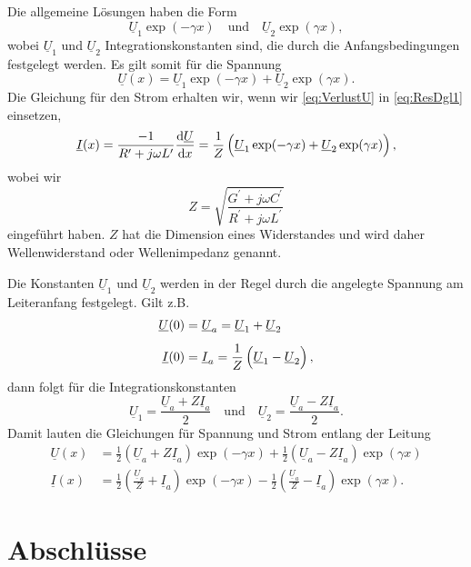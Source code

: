 \documentclass[paper=a4, parskip=half-, ngerman, fontsize=11pt]{scrreprt}
\begin{document}
Die allgemeine Lösungen haben die Form
\[ \underline{U}_{1} \exp(- \gamma x) \quad \text{und} \quad \underline{U}_{2} \exp(\gamma x), \] wobei
$\underline{U}_{1}$ und $\underline{U}_{2}$ Integrationskonstanten sind, die durch die Anfangsbedingungen festgelegt
werden.
Es gilt somit für die Spannung
\begin{equation}
    \underline{U}(x) = \underline{U}_{1} \exp(- \gamma x) + \underline{U}_{2} \exp(\gamma x) \label{eq:VerlustU}.
\end{equation}
Die Gleichung für den Strom erhalten wir, wenn wir \eqref{eq:VerlustU} in \eqref{eq:ResDgl1} einsetzen,
\begin{equation}
    \underline{I}(x) = \frac{-1}{R^{\prime} + j \omega L^{\prime}} \frac{\text{d} \underline{U}}{\text{d} x}
    = \frac{1}{Z}
    \left(
    \vphantom{\sqrt{1}{Z}}
    \underline{U}_{1} \exp(- \gamma x) + \underline{U}_{2} \exp(\gamma x) \right),
\end{equation}
wobei wir
\begin{equation}
    Z = \sqrt{\frac{G^{\prime} + j \omega C^{\prime}}{R^{\prime} + j \omega L^{\prime}}}
\end{equation}
eingeführt haben. $Z$ hat die Dimension eines Widerstandes und wird daher Wellenwiderstand oder Wellenimpedanz
genannt.

Die Konstanten $\underline{U}_{1}$ und $\underline{U}_{2}$ werden in der Regel durch die angelegte Spannung am
Leiteranfang festgelegt. Gilt z.B.
\begin{align*}
    \underline{U}(0) &= \underline{U}_{a} = \underline{U}_{1} + \underline{U}_{2} \\[1ex]
    \underline{I}(0) &= \underline{I}_{a} = \frac{1}{Z}
    \left(
    \vphantom{\sqrt{1}{Z}}
    \underline{U}_{1} - \underline{U}_{2} \right),
\end{align*}
dann folgt für die Integrationskonstanten
\[ \underline{U}_{1} = \frac{\underline{U}_{a} + Z \underline{I}_{a}}{2} \quad \text{und} \quad \underline{U}_{2} =
\frac{\underline{U}_{a} - Z \underline{I}_{a}}{2}. \]
Damit lauten die Gleichungen für Spannung und Strom entlang der Leitung
\begin{align}
    \underline{U}(x) &=
    \frac{1}{2} \left( \underline{U}_{a} + Z \underline{I}_{a} \right) \exp (- \gamma x)
    +
    \frac{1}{2} \left( \underline{U}_{a} - Z \underline{I}_{a} \right) \exp (\gamma x) \\[1ex]
    \underline{I}(x) &=
    \frac{1}{2} \left( \frac{\underline{U}_{a}}{Z} + \underline{I}_{a} \right) \exp (- \gamma x)
    -
    \frac{1}{2} \left( \frac{\underline{U}_{a}}{Z} - \underline{I}_{a} \right) \exp (\gamma x).
\end{align}



\section{Abschlüsse}


\printbibliography
\end{document}
